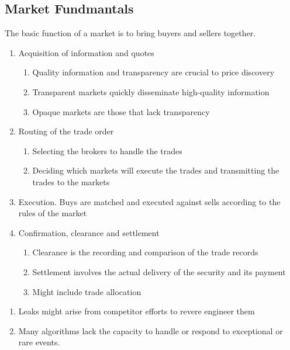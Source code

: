 \subsection{Market Fundmantals}

The basic function of a market is to bring buyers and sellers together.

\begin{process}
\begin{enumerate}[label=\roman*.]
\setlength{\itemsep}{0pt}
\item Acquisition of information and quotes
\begin{enumerate}[label=\arabic*.]
\setlength{\itemsep}{0pt}
\item Quality information and transparency are crucial to price discovery
\item Transparent markets quickly disseminate high-quality information
\item Opaque markets are those that lack transparency
\end{enumerate}
\item Routing of the trade order
\begin{enumerate}[label=\arabic*.]
\setlength{\itemsep}{0pt}
\item Selecting the brokers to handle the trades
\item Deciding which markets will execute the trades and transmitting the trades to the markets
\end{enumerate}
\item Execution. Buys are matched and executed against sells according to the rules of the market
\item Confirmation, clearance and settlement
\begin{enumerate}[label=\arabic*.]
\setlength{\itemsep}{0pt}
\item Clearance is the recording and comparison of the trade records
\item Settlement involves the actual delivery of the security and its payment
\item Might include trade allocation
\end{enumerate}
\end{enumerate}
\end{process}

\begin{remark}
\begin{enumerate}[label=\roman*.]
\setlength{\itemsep}{0pt}
\item Leaks might arise from competitor efforts to revere engineer them
\item Many algorithms lack the capacity to handle or respond to exceptional or rare events.
\end{enumerate}
\end{remark}

